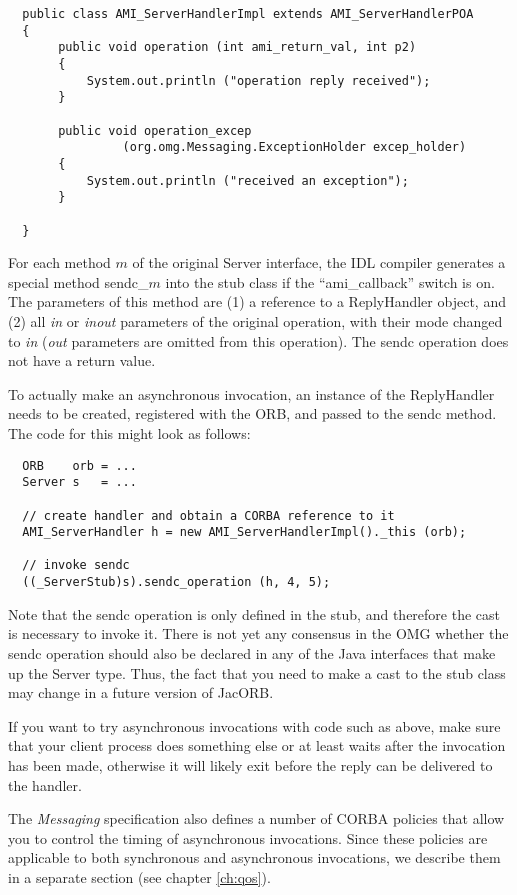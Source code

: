 \begin{verbatim}  public class AMI_ServerHandlerImpl extends AMI_ServerHandlerPOA
  {
       public void operation (int ami_return_val, int p2)
       {
           System.out.println ("operation reply received");
       }

       public void operation_excep
                (org.omg.Messaging.ExceptionHolder excep_holder)
       {
           System.out.println ("received an exception");
       }

  }
\end{verbatim}

For each method $m$ of the original Server interface, the IDL compiler
generates a special method sendc\_$m$ into the stub class if the
``ami\_callback'' switch is on.  The parameters of this method are (1)
a reference to a ReplyHandler object, and (2) all \emph{in} or
\emph{inout} parameters of the original operation, with their mode
changed to \emph{in} (\emph{out} parameters are omitted from this
operation).  The sendc operation does not have a return value.

To actually make an asynchronous invocation, an instance of the
ReplyHandler needs to be created, registered with the ORB, and passed
to the sendc method.  The code for this might look as follows:

\begin{verbatim}  ORB    orb = ...
  Server s   = ...

  // create handler and obtain a CORBA reference to it
  AMI_ServerHandler h = new AMI_ServerHandlerImpl()._this (orb);

  // invoke sendc
  ((_ServerStub)s).sendc_operation (h, 4, 5);
\end{verbatim}

Note that the sendc operation is only defined in the stub, and
therefore the cast is necessary to invoke it.  There is not yet any
consensus in the OMG whether the sendc operation should also be
declared in any of the Java interfaces that make up the Server type.
Thus, the fact that you need to make a cast to the stub class
may change in a future version of JacORB.

If you want to try asynchronous invocations with code such as above,
make sure that your client process does something else or at least
waits after the invocation has been made, otherwise it will likely
exit before the reply can be delivered to the handler.

The \emph{Messaging} specification also defines a number of CORBA
policies that allow you to control the timing of asynchronous
invocations.  Since these policies are applicable to both synchronous
and asynchronous invocations, we describe them in a separate section
(see chapter \ref{ch:qos}).


